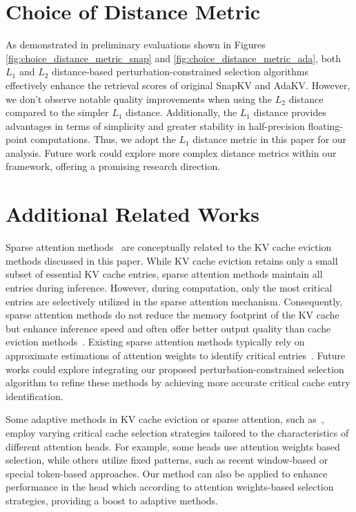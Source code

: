 {\section{Choice of Distance Metric}
\label{apdx:distance}
 As demonstrated in preliminary evaluations shown in Figures \ref{fig:choice_distance_metric_snap} and \ref{fig:choice_distance_metric_ada}, both $L_1$ and $L_2$ distance-based perturbation-constrained selection algorithms effectively enhance the retrieval scores of original SnapKV and AdaKV. However, we don't observe notable quality improvements when using the $L_2$ distance compared to the simpler $L_1$ distance. Additionally, the $L_1$ distance provides advantages in terms of simplicity and greater stability in half-precision floating-point computations. Thus, we adopt the $L_1$ distance metric in this paper for our analysis.  Future work could explore more complex distance metrics within our framework, offering a promising research direction.
 
 

\section{Additional Related Works}
Sparse attention methods~\cite{jiang2024minference10acceleratingprefilling,tang2024questqueryawaresparsityefficient,lv2024critiprefillsegmentwisecriticalitybasedapproach} are conceptually related to the KV cache eviction methods discussed in this paper. While KV cache eviction retains only a small subset of essential KV cache entries, sparse attention methods maintain all entries during inference. However, during computation, only the most critical entries are selectively utilized in the sparse attention mechanism. Consequently, sparse attention methods do not reduce the memory footprint of the KV cache but enhance inference speed and often offer better output quality than cache eviction methods~\cite{tang2024questqueryawaresparsityefficient}. Existing sparse attention methods typically rely on approximate estimations of attention weights to identify critical entries~\cite{tang2024questqueryawaresparsityefficient,lv2024critiprefillsegmentwisecriticalitybasedapproach}. Future works could explore integrating our proposed perturbation-constrained selection algorithm to refine these methods by achieving more accurate critical cache entry identification.

Some adaptive methods in KV cache eviction or sparse attention, such as~\cite{ge2024modeltellsdiscardadaptive, jiang2024minference10acceleratingprefilling}, employ varying critical cache selection strategies tailored to the characteristics of different attention heads. For example, some heads use attention weights based selection, while others utilize fixed patterns, such as recent window-based or special token-based approaches. Our method can also be applied to enhance performance in the head which according to attention weights-based selection strategies, providing a boost to adaptive methods.

}
